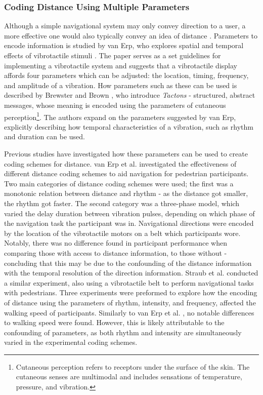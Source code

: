 \documentclass{mpaper}
\begin{document}
\subsubsection{Coding Distance Using Multiple Parameters}\label{sec:coding-distance}
Although a simple navigational system may only convey direction to a user, a more effective one would also typically convey an idea of distance \cite{burntt2002empirical}. Parameters to encode information is studied by van Erp, who explores spatial and temporal effects of vibrotactile stimuli \cite{guidelines}. The paper serves as a set guidelines for implementing a vibrotactile system and suggests that a vibrotactile display affords four parameters which can be adjusted: the location, timing, frequency, and amplitude of a vibration. How parameters such as these can be used is described by Brewster and Brown \cite{10.5555/976310.976313}, who introduce \textit{Tactons} - structured, abstract messages, whose meaning is encoded using the parameters of cutaneous perception\footnote{Cutaneous perception refers to receptors under the surface of the skin. The cutaneous senses are multimodal and includes sensations of temperature, pressure, and vibration.}. The authors expand on the parameters suggested by van Erp, explicitly describing how temporal characteristics of a vibration, such as rhythm and duration can be used.

Previous studies have investigated how these parameters can be used to create coding schemes for distance. van Erp et al. \cite{10.1145/1060581.1060585} investigated the effectiveness of different distance coding schemes to aid navigation for pedestrian participants. Two main categories of distance coding schemes were used; the first was a monotonic relation between distance and rhythm - as the distance got smaller, the rhythm got faster. The second category was a three-phase model, which varied the delay duration between vibration pulses, depending on which phase of the navigation task the participant was in. Navigational directions were encoded by the location of the vibrotactile motors on a belt which participants wore. Notably, there was no difference found in participant performance when comparing those with access to distance information, to those without - concluding that this may be due to the confounding of the distance information with the temporal resolution of the direction information. Straub et al. \cite{5326374} conducted a similar experiment, also using a vibrotactile belt to perform navigational tasks with pedestrians. Three experiments were preformed to explore how the encoding of distance using the parameters of rhythm, intensity, and frequency, affected the walking speed of participants. Similarly to van Erp et al. \cite{10.1145/1060581.1060585}, no notable differences to walking speed were found. However, this is likely attributable to the confounding of parameters, as both rhythm and intensity are simultaneously varied in the experimental coding schemes.
\end{document}
